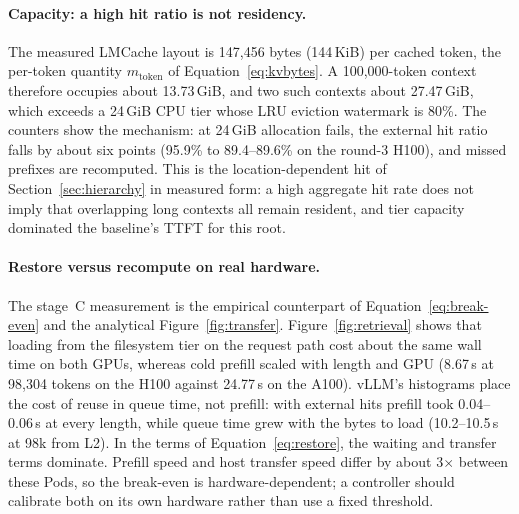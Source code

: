 \paragraph{Capacity: a high hit ratio is not residency.}
The measured LMCache layout is 147,456 bytes (144\,KiB) per cached token, the
per-token quantity $m_{\mathrm{token}}$ of Equation~\ref{eq:kvbytes}. A
100,000-token context therefore occupies about 13.73\,GiB, and two such contexts
about 27.47\,GiB, which exceeds a 24\,GiB CPU tier whose LRU eviction watermark
is 80\%. The counters show the mechanism: at 24\,GiB allocation fails, the
external hit ratio falls by about six points (95.9\% to 89.4--89.6\% on the
round-3 H100), and missed prefixes are recomputed. This is the
location-dependent hit of Section~\ref{sec:hierarchy} in measured form: a high
aggregate hit rate does not imply that overlapping long contexts all remain
resident, and tier capacity dominated the baseline's TTFT for this root.

\paragraph{Restore versus recompute on real hardware.}
The stage~C measurement is the empirical counterpart of
Equation~\ref{eq:break-even} and the analytical Figure~\ref{fig:transfer}.
Figure~\ref{fig:retrieval} shows that loading from the filesystem tier on the
request path cost about the same wall time on both GPUs, whereas cold prefill
scaled with length and GPU (8.67\,s at 98,304 tokens on the H100 against
24.77\,s on the A100). vLLM's histograms place the cost of reuse in queue time,
not prefill: with external hits prefill took 0.04--0.06\,s at every length,
while queue time grew with the bytes to load (10.2--10.5\,s at 98k from L2).
In the terms of Equation~\ref{eq:restore}, the waiting and transfer terms
dominate. Prefill speed and host transfer speed differ by about 3$\times$
between these Pods, so the break-even is hardware-dependent; a controller should
calibrate both on its own hardware rather than use a fixed threshold.


